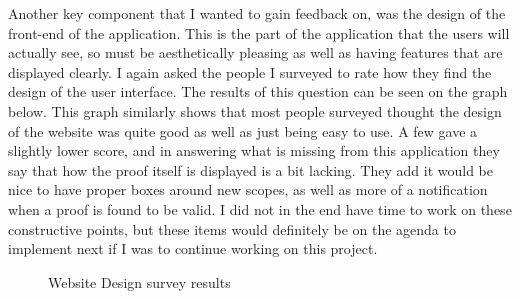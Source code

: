 Another key component that I wanted to gain feedback on, was the design of the front-end of the application. This is the part of the application that the users will actually see, so must be aesthetically pleasing as well as having features that are displayed clearly. I again asked the people I surveyed to rate how they find the design of the user interface. The results of this question can be seen on the graph below. This graph similarly shows that most people surveyed thought the design of the website was quite good as well as just being easy to use. A few gave a slightly lower score, and in answering what is missing from this application they say that how the proof itself is displayed is a bit lacking. They add it would be nice to have proper boxes around new scopes, as well as more of a notification when a proof is found to be valid. I did not in the end have time to work on these constructive points, but these items would definitely be on the agenda to implement next if I was to continue working on this project. 

\begin{figure}[!ht]
	\centering
	\caption{Website Design survey results}
\end{figure}

